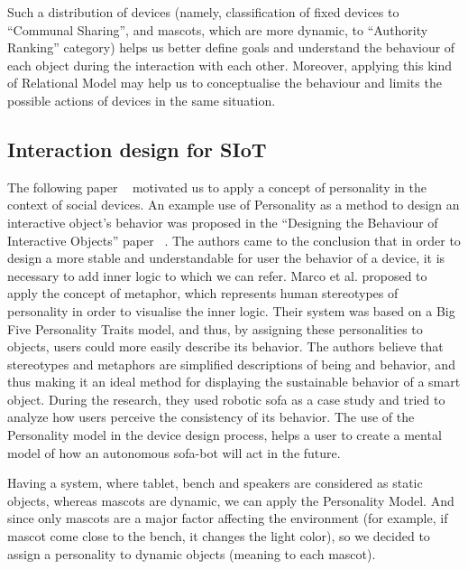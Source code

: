 \par Such a distribution of devices (namely, classification of fixed devices to “Communal Sharing”, and mascots, which are more dynamic, to “Authority Ranking” category) helps us better define goals and understand the behaviour of each object during the interaction with each other. Moreover, applying this kind of Relational Model may help us to conceptualise the behaviour and limits the possible actions of devices in the same situation.

\subsection{Interaction design for SIoT}
\label{sec:Interaction design for SIoT}

\par The following paper ~\cite{soro2018social} motivated us to apply a concept of personality in the context of social devices. An example use of Personality as a method to design an interactive object’s behavior was proposed in the “Designing the Behaviour of Interactive Objects” paper ~\cite{spadafora2016designing}. The authors came to the conclusion that in order to design a more stable and understandable for user the behavior of a device, it is necessary to add inner logic to which we can refer. Marco et al. proposed to apply the concept of metaphor, which represents human stereotypes of personality in order to visualise the inner logic. Their system was based on a Big Five Personality Traits model, and thus, by assigning these personalities to objects, users could more easily describe its behavior. The authors believe that stereotypes and metaphors are simplified descriptions of being and behavior, and thus making it an ideal method for displaying the sustainable behavior of a smart object. During the research, they used robotic sofa as a case study and tried to analyze how users perceive the consistency of its behavior. The use of the Personality model in the device design process, helps a user to create a mental model of how an autonomous sofa-bot will act in the future.

Having a system, where tablet, bench and speakers are considered as static objects, whereas mascots are dynamic, we can apply the Personality Model. And since only mascots are a major factor affecting the environment (for example, if mascot come close to the bench, it changes the light color), so we decided to assign a personality to dynamic objects (meaning to each mascot).

